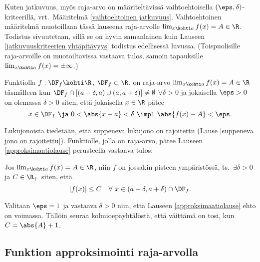 Kuten jatkuvuus, myös raja-arvo on määriteltävissä vaihtoehtoisella 
$(\eps,\delta)$-kritee\-rillä, vrt.\ Määritelmä \ref{vaihtoehtoinen jatkuvuus}. Vaihtoehtoinen
määritelmä muotoillaan tässä lauseena raja-arvolle $\lim_{x\kohti a} f(x)= A\in\R$. Todistus
sivuutetaan, sillä se on hyvin samanlainen kuin Lauseen \ref{jatkuvuuskriteerien yhtäpitävyys}
todistus edellisessä luvussa. (Toispuolisille raja-arvoille on muotoiltavissa vastaava tulos,
samoin tapauksille $\lim_{x\kohti a} f(x) = \pm\infty$.)
\begin{*Lause}  \label{approksimaatiolause}
 
Funktiolla $f:\DF_f\kohti\R$, $\DF_f\subset\R$, on raja-arvo $\lim_{x\kohti a} f(x)=A\in\R$
täsmälleen kun $\DF_f\cap[(a-\delta,a)\cup(a,a+\delta)]\neq\emptyset$ $\forall \delta>0$ ja
jokaisella $\eps>0$ on olemassa $\delta>0$ siten, että jokaisella $x\in\R$ pätee
\[
x\in\DF_f \ \ja \ 0<\abs{x-a}<\delta \ \impl \ \abs{f(x)-A}<\eps.
\]
\end{*Lause}
Lukujonoista tiedetään, että suppeneva lukujono on rajoitettu 
(Lause \ref{suppeneva jono on rajoitettu}). Funktiolle, jolla on raja-arvo, pätee Lauseen
\ref{approksimaatiolause} perusteella vastaava tulos:
\begin{Lause} \label{raja-arvo ja rajoitettu funktio}  
Jos $\lim_{x \kohti a} f(x) = A\in\R$, niin $f$ on  jossakin pisteen
ympäristössä, ts.\ $\exists \delta>0$ ja $C\in\R_+$ siten, että
\[ 
|f(x)| \le C \quad \forall\ x\in(a-\delta,a+\delta)\cap\DF_f. 
\]
\end{Lause}
\tod Valitaan $\eps=1$ ja vastaava $\delta>0$ niin, että Lauseen \ref{approksimaatiolause}
ehto on voimassa. Tällöin seuraa kolmioepäyhtälöstä, että väittämä on tosi, kun
$C=\abs{A}+1$. \loppu

\subsection{Funktion approksimointi raja-arvolla}

